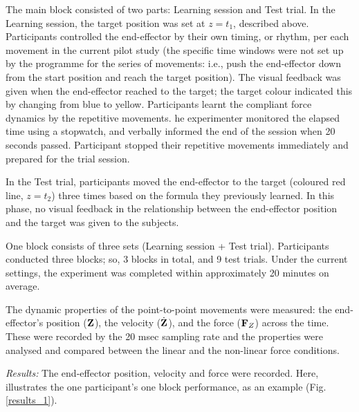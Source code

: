 The main block consisted of two parts: Learning session and Test trial. In the Learning session, the target position was set at $z= t_1$, described above. Participants controlled the end-effector by their own timing, or rhythm, per each movement in the current pilot study (the specific time windows were not set up by the programme for the series of movements: i.e., push the end-effector down from the start position and reach the target position). The visual feedback was given when the end-effector reached to the target; the target colour indicated this by changing from blue to yellow. Participants learnt the compliant force dynamics by the repetitive movements. he experimenter monitored the elapsed time using a stopwatch, and verbally informed the end of the session when 20 seconds passed. Participant stopped their repetitive movements immediately and prepared for the trial session. 

In the Test trial, participants moved the end-effector to the target (coloured red line, $z = t_2$) three times based on the formula they previously learned. In this phase, no visual feedback in the relationship between the end-effector position and the target was given to the subjects.

One block consists of three sets (Learning session + Test trial). Participants conducted three blocks; so, 3 blocks in total, and 9 test trials. Under the current settings, the experiment was completed within approximately 20 minutes on average.

The dynamic properties of the point-to-point movements were measured: the end-effector's position ($\mathbf{Z}$), the velocity ($\dot{\mathbf{Z}}$), and the force ($\mathbf{F}_Z$) across the time. These were recorded by the 20 msec sampling rate and the properties were analysed and compared between the linear and the non-linear force conditions.






\textit{Results:} The end-effector position, velocity and force were recorded. Here, illustrates the one participant's one block performance, as an example (Fig. \ref{results_1}).

